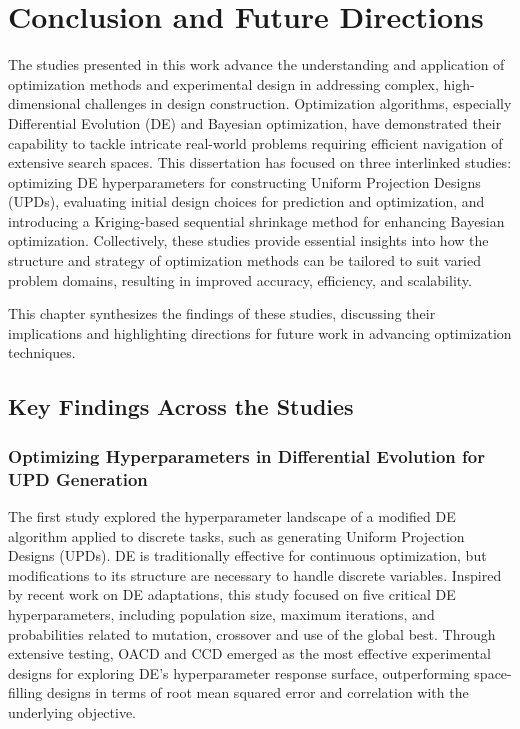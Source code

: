 \chapter{Conclusion and Future Directions}

The studies presented in this work advance the understanding and application of optimization methods and experimental design in addressing complex, high-dimensional challenges in design construction. Optimization algorithms, especially Differential Evolution (DE) and Bayesian optimization, have demonstrated their capability to tackle intricate real-world problems requiring efficient navigation of extensive search spaces. This dissertation has focused on three interlinked studies: optimizing DE hyperparameters for constructing Uniform Projection Designs (UPDs), evaluating initial design choices for prediction and optimization, and introducing a Kriging-based sequential shrinkage method for enhancing Bayesian optimization. Collectively, these studies provide essential insights into how the structure and strategy of optimization methods can be tailored to suit varied problem domains, resulting in improved accuracy, efficiency, and scalability.

This chapter synthesizes the findings of these studies, discussing their implications and highlighting directions for future work in advancing optimization techniques.

\section{Key Findings Across the Studies}

\subsection{Optimizing Hyperparameters in Differential Evolution for UPD Generation}
The first study explored the hyperparameter landscape of a modified DE algorithm applied to discrete tasks, such as generating Uniform Projection Designs (UPDs). DE is traditionally effective for continuous optimization, but modifications to its structure are necessary to handle discrete variables. Inspired by recent work on DE adaptations, this study focused on five critical DE hyperparameters, including population size, maximum iterations, and probabilities related to mutation, crossover and use of the global best. Through extensive testing, OACD and CCD emerged as the most effective experimental designs for exploring DE's hyperparameter response surface, outperforming space-filling designs in terms of root mean squared error and correlation with the underlying objective.

